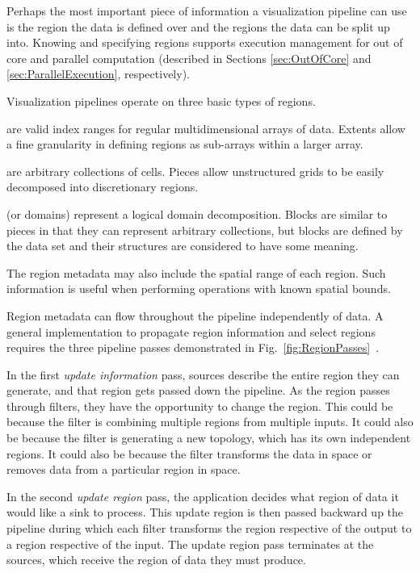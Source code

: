 \documentclass[journal,twocolumn,10pt,letterpaper,twoside]{IEEEtran}
\newcommand*{\lcite}[1]{~\cite{#1}}
\newcommand*{\figref}[1]{Fig.~\ref{#1}}
\newcommand*{\keyterm}[1]{\emph{#1}}
\begin{document}
Perhaps the most important piece of information a visualization pipeline
can use is the region the data is defined over and the regions the data can
be split up into.  Knowing and specifying regions supports execution
management for out of core and parallel computation (described in Sections
\ref{sec:OutOfCore} and \ref{sec:ParallelExecution}, respectively).

Visualization pipelines operate on three basic types of regions.
\begin{description}
\item[Extents] are valid index ranges for regular multidimensional arrays
  of data.  Extents allow a fine granularity in defining regions as
  sub-arrays within a larger array.
\item[Pieces] are arbitrary collections of cells.  Pieces allow
  unstructured grids to be easily decomposed into discretionary regions.
\item[Blocks] (or domains) represent a logical domain decomposition.
  Blocks are similar to pieces in that they can represent arbitrary
  collections, but blocks are defined by the data set and their structures
  are considered to have some meaning.
\end{description}
The region metadata may also include the spatial range of each region.
Such information is useful when performing operations with known spatial
bounds.

Region metadata can flow throughout the pipeline independently of data.  A
general implementation to propagate region information and select regions
requires the three pipeline passes demonstrated in
\figref{fig:RegionPasses}\lcite{Ahrens2001}.

In the first \keyterm{update information} pass, sources describe the entire
region they can generate, and that region gets passed down the pipeline.
As the region passes through filters, they have the opportunity to change
the region.  This could be because the filter is combining multiple regions
from multiple inputs.  It could also be because the filter is generating a
new topology, which has its own independent regions.  It could also be
because the filter transforms the data in space or removes data from a
particular region in space.

In the second \keyterm{update region} pass, the application decides what
region of data it would like a sink to process.  This update region is then
passed backward up the pipeline during which each filter transforms the
region respective of the output to a region respective of the input.  The
update region pass terminates at the sources, which receive the region of
data they must produce.
\end{document}
